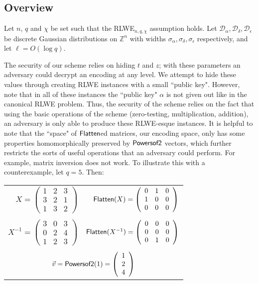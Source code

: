 \subsection{Overview}

Let $n$, $q$ and $\chi$ be set such that the RLWE$_{n,q,\chi}$ assumption holds.  Let $\mathcal{D}_\alpha, \mathcal{D}_\delta, \mathcal{D}_\epsilon$ be discrete Gaussian distributions on $\mathbb{Z}^n$ with widths $\sigma_\alpha, \sigma_\delta, \sigma_\epsilon$ respectively, and let $\ell = O(\log q)$.  

The security of our scheme relies on hiding $t$ and $z$; with these parameters an adversary could decrypt an encoding at any level.  We attempt to hide these values through creating RLWE instances with a small ``public key".  However, note that in all of these instances the ``public key" $\alpha$ is not given out like in the canonical RLWE problem.  Thus, the security of the scheme relies on the fact that using the basic operations of the scheme (zero-testing, multiplication, addition), an adversary is only able to produce these RLWE-esque instances.  It is helpful to note that the ``space" of $\mathsf{Flatten}$ed matrices, our encoding space, only has some properties homomorphically preserved by $\mathsf{Powersof2}$ vectors, which further restricts the sorts of useful operations that an adversary could perform.  For example, matrix inversion does not work.  To illustrate this with a counterexample, let $q = 5$.  Then: 

\begin{center}
\begin{tabular}{rr}
$X = \left(\begin{array}{ccc}1 & 2 & 3\\ 3 & 2 & 1\\ 1 & 3 & 2\end{array}\right)$ & $\mathsf{Flatten}(X) = \left(\begin{array}{ccc}0 & 1 & 0\\ 1 & 0 & 0\\ 0 & 0 & 0\end{array}\right)$ \\\\
$X^{-1} = \left(\begin{array}{ccc}3 & 0 & 3\\ 0 & 2 & 4\\ 1 & 2 & 3\end{array}\right)$& $\mathsf{Flatten}(X^{-1}) = \left(\begin{array}{ccc}0 & 0 & 0\\ 0 & 0 & 0\\ 0 & 1 & 0\end{array}\right)$\\\\
\multicolumn{2}{c}{$\vec{v} = \mathsf{Powersof2}(1) = \left(\begin{array}{c}1 \\ 2 \\ 4 \end{array}\right)$}
\end{tabular}
\end{center}

